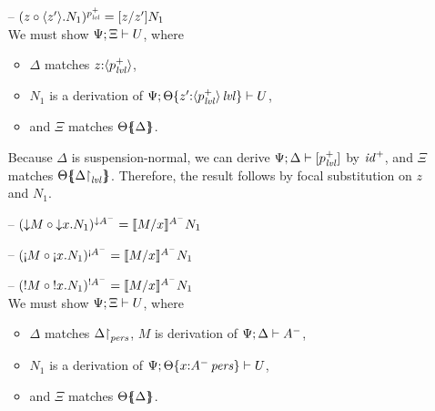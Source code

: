 \begin{itemize}
\item[--] $(\subst{z}{\tetap{z'}{N_1}})^{p^+_{\mlvl}} = [z/z']N_1$\smallskip\\
  We must show $\foc{\Psi}{\Xi}{U}$, where 
  \begin{itemize}
   \item $\Delta$ matches $z{:}\susp{p^+_\mlvl}$,
   \item 
      $N_1$ is a derivation of 
      $\foc{\Psi}{\tackon{\Theta}{z'{:}\islvl{\susp{p^+_\mlvl}}}}{U}$,
   \item and $\Xi$ matches $\frameoff{\Theta}{\Delta}$.
  \end{itemize}
  Because $\Delta$ is suspension-normal, 
  we can derive $\foc{\Psi}{\Delta}{[p^+_\mlvl]}$ by ${\it
    id}^+$, and
  $\Xi$ matches 
  $\frameoff{\Theta}{\restrictto{\Delta}{\mlvl}}$.
  Therefore, the result follows by focal substitution on $z$ and $N_1$. 

\smallskip
 
\item[--] $(\subst{\tdownr{M}}{\tdownl{x}{N_1}})^{{\downarrow}A^-} 
           = \rsubsta{M}{x}{N_1}{A^-}$ %



\item[--] $(\subst{\tgnabr{M}}{\tgnabl{x}{N_1}})^{{\scriptgnab}A^-}
           = \rsubsta{M}{x}{N_1}{A^-}$

\item[--] $(\subst{\tbangr{M}}{\tbangl{x}{N_1}})^{{!}A^-}
           = \rsubsta{M}{x}{N_1}{A^-}$ \smallskip\\
  We must show $\foc{\Psi}{\Xi}{U}$, where
  \begin{itemize}
  \item $\Delta$ matches $\restrictto{\Delta}{\mpers}$,
        $M$ is derivation of $\foc{\Psi}{\Delta}{A^-}$, 
  \item $N_1$ is a derivation of 
        $\foc{\Psi}{\tackon{\Theta}{x{:}\ispers{A^-}}}{U}$,
  \item and $\Xi$ matches $\frameoff{\Theta}{\Delta}$.
  \end{itemize}


\end{itemize}
